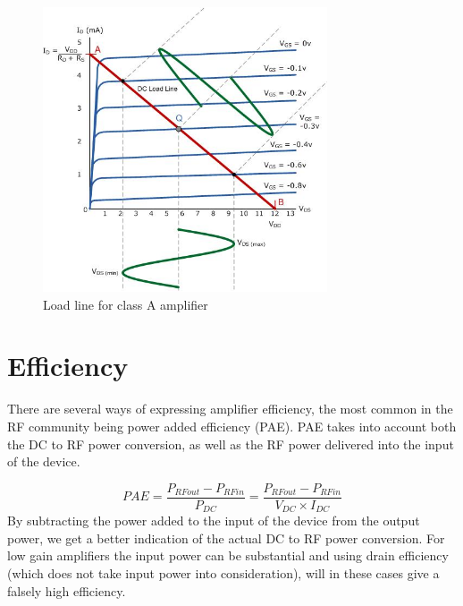\begin{figure}[h]
	  \centering
	  \includegraphics[width=0.75\textwidth]{img/Load_line_graphics}
	  \caption{Load line for class A amplifier}
	  \label{fig:fig_Load_line}
\end{figure}

\section{Efficiency}
There are several ways of expressing amplifier efficiency, the most common in the RF community being power added efficiency (PAE). PAE takes into account both the DC to RF power conversion, as well as the RF power delivered into the input of the device.

\begin{equation}
	PAE=\frac{P_{RFout}-P_{RFin}}{P_{DC}}=\frac{P_{RFout}-P_{RFin}}{V_{DC} \times I_{DC}} 
\end{equation}
By subtracting the power added to the input of the device from the output power, we get a better indication of the actual DC to RF power conversion. For low gain amplifiers the input power can be substantial and using drain efficiency (which does not take input power into consideration), will in these cases give a falsely high efficiency.
